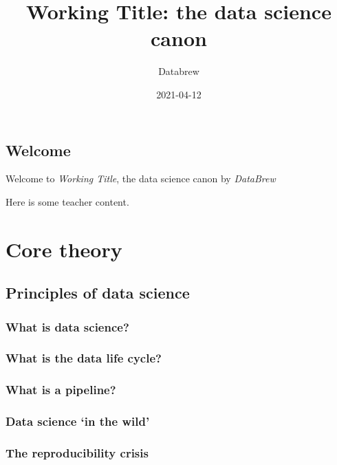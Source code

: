 \documentclass[
]{book}
\title{Working Title: the data science canon}
\author{Databrew}
\date{2021-04-12}
\begin{document}
\maketitle

{
\setcounter{tocdepth}{1}
\tableofcontents
}
\hypertarget{welcome}{%
\chapter{Welcome}\label{welcome}}

Welcome to \emph{Working Title}, the data science canon by \emph{DataBrew}

Here is some teacher content.

\hypertarget{part-core-theory}{%
\part{Core theory}\label{part-core-theory}}

\hypertarget{principles-of-data-science}{%
\chapter{Principles of data science}\label{principles-of-data-science}}

\hypertarget{what-is-data-science}{%
\section{What is data science?}\label{what-is-data-science}}

\hypertarget{what-is-the-data-life-cycle}{%
\section{What is the data life cycle?}\label{what-is-the-data-life-cycle}}

\hypertarget{what-is-a-pipeline}{%
\section{What is a pipeline?}\label{what-is-a-pipeline}}

\hypertarget{data-science-in-the-wild}{%
\section{Data science `in the wild'}\label{data-science-in-the-wild}}

\hypertarget{the-reproducibility-crisis}{%
\section{The reproducibility crisis}\label{the-reproducibility-crisis}}
\end{document}
